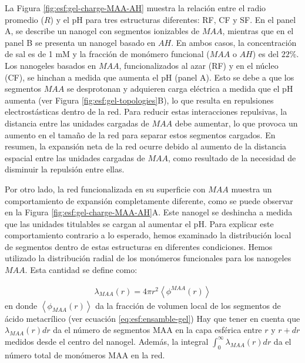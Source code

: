 La Figura \ref{fig:esf:gel-charge-MAA-AH} muestra la relaci\'on entre el radio promedio ($R$) y el pH para tres estructuras diferentes: RF, CF y SF. En el panel A, se describe un nanogel con segmentos ionizables de $MAA$, mientras que en el panel B se presenta un nanogel basado en $AH$. En ambos casos, la concentraci\'on de sal es de 1 mM y la fracci\'on de mon\'omero funcional ($MAA$ o $AH$) es del $22\%$. Los nanogeles basados en $MAA$, funcionalizados al azar (RF) y en el n\'ucleo (CF), se hinchan a medida que aumenta el pH (panel A). Esto se debe a que los segmentos $MAA$ se desprotonan y adquieren carga el\'ectrica a medida que el pH aumenta (ver Figura \ref{fig:esf:gel-topologies}B), lo que resulta en repulsiones electrost\'asticas dentro de la red. Para reducir estas interacciones repulsivas, la distancia entre las unidades cargadas de $MAA$ debe aumentar, lo que provoca un aumento en el tama\~no de la red para separar estos segmentos cargados. En resumen, la expansi\'on neta de la red ocurre debido al aumento de la distancia espacial entre las unidades cargadas de $MAA$, como resultado de la necesidad de disminuir la repulsi\'on entre ellas.



Por otro lado, la red funcionalizada en su superficie con $MAA$ muestra un comportamiento de expansi\'on completamente diferente, como se puede observar en la Figura \ref{fig:esf:gel-charge-MAA-AH}A. Este nanogel se deshincha a medida que las unidades titulables se cargan al aumentar el pH. Para explicar este comportamiento contrario a lo esperado, hemos examinado la distribuci\'on local de segmentos dentro de estas estructuras en diferentes condiciones. Hemos utilizado la distribuci\'on radial de los mon\'omeros funcionales para los nanogeles $MAA$. Esta cantidad se define como:



%
\begin{align}
    \lambda_{MAA}(r)= 4\pi r^2\left<\phi^{MAA}(r)\right>
\end{align}
%
\noindent en donde $\left<\phi_{MAA}(r)\right>$ da la fracci\'on de volumen local de los segmentos de \'acido metacr\'ilico (ver ecuaci\'on \ref{eq:esf:ensamble-gel})
Hay que tener en cuenta que $\lambda_{MAA}(r) dr$ da el n\'umero de segmentos MAA en la capa esf\'erica entre $r$ y $r+dr$ medidos desde el centro del nanogel.
Adem\'as, la integral $\int_0^\infty \lambda_{MAA}(r) dr$ da el n\'umero total de mon\'omeros MAA en la red.


